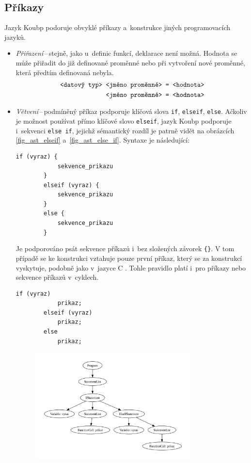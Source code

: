 \subsection*{Příkazy}
Jazyk Koubp podoruje obvyklé příkazy a~konstrukce jiných programovacích jazyků.
\begin{itemize}
    \item \emph{Přiřazení}\,--\,stejně, jako u~definic funkcí, deklarace není možná.
    Hodnota se může přiřadit do již definované proměnné nebo při vytvoření nové proměnné, která předtím definovaná nebyla.
    \begin{align*}
        \text{\texttt{<datový typ> <jméno proměnné> }} &\text{\texttt{= <hodnota>}} \\
        \text{\texttt{<jméno proměnné> }} &\text{\texttt{= <hodnota>}}        
    \end{align*}
    \item \emph{Větvení}\,--\,podmíněný příkaz podporuje klíčová slova \texttt{if}, \texttt{elseif}, \texttt{else}.
    Ačkoliv je možnost používat přímo klíčové slovo \texttt{elseif}, jazyk Koubp podporuje i~sekvenci \texttt{else if}, jejichž sémantický rozdíl je patrně vidět na obrázcích \ref{fig_ast_elseif} a~\ref{fig_ast_else_if}.
    Syntaxe je následující:
    \begin{lstlisting}[language=Koubp]
        if (vyraz) {
            sekvence_prikazu
        }
        elseif (vyraz) {
            sekvence_prikazu
        }
        else {
            sekvence_prikazu
        }
    \end{lstlisting}
    Je podporováno psát sekvence příkazů i~bez složených závorek \texttt{\{\}}.
    V tom případě se ke konstrukci vztahuje pouze první příkaz, který se za konstrukcí vyskytuje, podobně jako v~jazyce C \cite{ISO-C-Standard}.
    Tohle pravidlo platí i~pro příkazy nebo sekvence příkazů v~cyklech. 
    \begin{lstlisting}[language=Koubp]
        if (vyraz) 
            prikaz;
        elseif (vyraz)
            prikaz;
        else
            prikaz;
    \end{lstlisting}
    \begin{figure}[ht]
        \centering
        \includegraphics[width=0.8\textwidth]{obrazky-figures/ast_if_elseif.pdf}

\end{figure}
\end{itemize}
